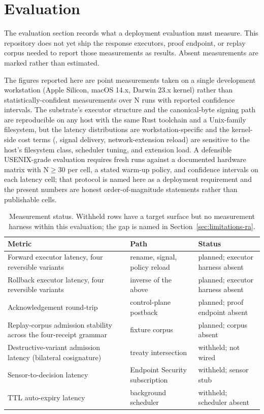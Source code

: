 \section{Evaluation}
\label{sec:evaluation-ra}

The evaluation section records what a deployment evaluation must measure.
This repository does not yet ship the response executors, proof endpoint,
or replay corpus needed to report those measurements as results. Absent
measurements are marked rather than estimated.

The figures reported here are point measurements taken on a single
development workstation (Apple Silicon, macOS 14.x, Darwin 23.x kernel)
rather than statistically-confident measurements over N runs with
reported confidence intervals. The substrate's executor structure and
the canonical-byte signing path are reproducible on any host with the
same Rust toolchain and a Unix-family filesystem, but the latency
distributions are workstation-specific and the kernel-side cost terms
(, signal delivery, network-extension reload) are
sensitive to the host's filesystem class, scheduler tuning, and
extension load. A defensible USENIX-grade evaluation requires fresh
runs against a documented hardware matrix with N$\geq$30 per cell, a
stated warm-up policy, and confidence intervals on each latency cell;
that protocol is named here as a deployment requirement and the
present numbers are honest order-of-magnitude statements rather than
publishable cells.

\begin{table}[t]
\centering
\caption{Measurement status. Withheld rows have a target surface but
no measurement harness within this evaluation; the gap is named in
Section~\ref{sec:limitations-ra}.}
\label{tab:eval-ra}
\small
\begin{tabularx}{\textwidth}{@{}>{\raggedright\arraybackslash}p{}>{\raggedright\arraybackslash}p{}>{\raggedright\arraybackslash}X@{}}
\toprule
Metric & Path & Status \\
\midrule
Forward executor latency, four reversible variants & rename, signal, policy reload & planned; executor harness absent \\
Rollback executor latency, four reversible variants & inverse of the above & planned; executor harness absent \\
Acknowledgement round-trip & control-plane postback & planned; proof endpoint absent \\
Replay-corpus admission stability across the four-receipt grammar & fixture corpus & planned; corpus absent \\
Destructive-variant admission latency (bilateral cosignature) & treaty intersection & withheld; not wired \\
Sensor-to-decision latency & Endpoint Security subscription & withheld; sensor stub \\
TTL auto-expiry latency & background scheduler & withheld; scheduler absent \\
\bottomrule
\end{tabularx}
\end{table}

